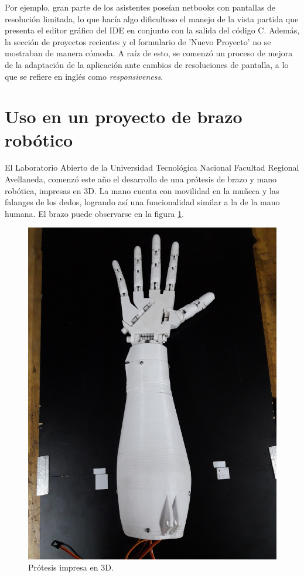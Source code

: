 Por ejemplo, gran parte de los asistentes poseían netbooks con pantallas de resolución limitada, lo que hacía algo dificultoso el manejo de la vista partida que presenta el editor gráfico del IDE en conjunto con la salida del código C. Además, la sección de proyectos recientes y el formulario de 'Nuevo Proyecto' no se mostraban de manera cómoda. A raíz de esto, se comenzó un proceso de mejora de la adaptación de la aplicación ante cambios de resoluciones de pantalla, a lo que se refiere en inglés como  \emph{responsiveness}.

\section{Uso en un proyecto de brazo robótico}
El Laboratorio Abierto de la Universidad Tecnológica Nacional Facultad Regional Avellaneda, comenzó este año el desarrollo de una prótesis de brazo y mano robótica, impresas en 3D. La mano cuenta con movilidad en la muñeca y las falanges de los dedos, logrando así una funcionalidad similar a la de la mano humana. El brazo puede observarse en la figura \ref{fig:brazo}.

\begin{figure}[H]
\centering
\includegraphics[scale=.1]{./Figures/brazo.jpg}
\caption{Prótesis impresa en 3D.}
\label{fig:brazo}
\end{figure}

